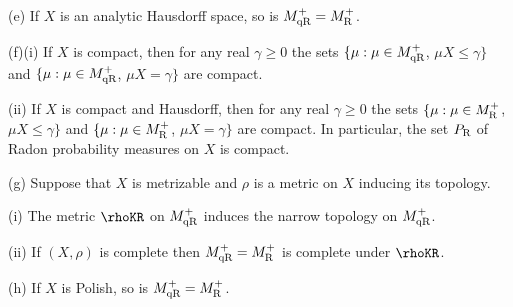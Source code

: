 (e) If $X$ is an analytic Hausdorff space, so is $M^+_{\text{qR}}=M^+_{\text{R}}$.

(f)(i) If $X$ is compact, then for any real $\gamma\ge 0$ the sets
$\{\mu:\mu\in M^+_{\text{qR}}$, $\mu X\le\gamma\}$ and $\{\mu:\mu\in M^+_{\text{qR}}$,
$\mu X=\gamma\}$ are compact.

\quad(ii) If $X$ is compact and Hausdorff, then for any real
$\gamma\ge 0$ the sets
$\{\mu:\mu\in M^+_{\text{R}}$, $\mu X\le\gamma\}$ and $\{\mu:\mu\in M^+_{\text{R}}$,
$\mu X=\gamma\}$ are compact.  In particular, the set $P_{\text{R}}$ of
Radon probability measures on $X$ is compact.

(g) Suppose that $X$ is metrizable and
$\rho$ is a metric on $X$ inducing its topology.

\quad(i) The metric $\rhoKR$ on $M^+_{\text{qR}}$
induces the narrow topology on $M^+_{\text{qR}}$.

\quad(ii) If $(X,\rho)$ is complete then $M^+_{\text{qR}}=M^+_{\text{R}}$ is complete
under $\rhoKR$.

(h) If $X$ is Polish, so is $M^+_{\text{qR}}=M^+_{\text{R}}$.

